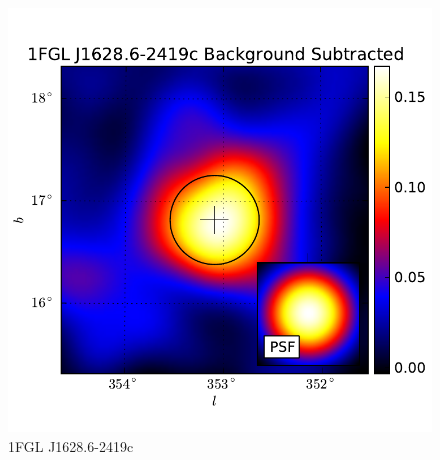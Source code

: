 \documentclass[preprint]{aastex}
\begin{document}
  \begin{figure}
    \begin{center}
      \includegraphics[type=pdf,ext=.pdf,read=.pdf]{source_plots/source_1FGL_J1628.6-2419c}
    \end{center}
    \caption{1FGL J1628.6-2419c}
  \end{figure}
\end{document}
